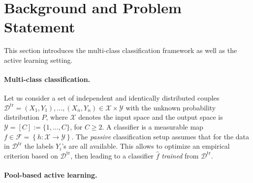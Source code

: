 \documentclass[twoside]{article}
\theoremstyle{definition}
\theoremstyle{remark}
\newcommand{\Dtrain}{\mathcal{D}^{\mathrm{tr}}}
\newcommand{\acc}[1]{\left\{ #1 \right\}}
\begin{document}






\section{Background and Problem Statement}
\label{sec:back_pb_statement}

This section introduces the multi-class classification framework as well as the active learning setting. 
%
\paragraph*{Multi-class classification.}
%
Let us consider a set of independent and identically distributed couples $\Dtrain=(X_1,Y_1),\ldots,(X_n,Y_n) \in\mathcal{X} \times \mathcal{Y}$ with the unknown probability distribution $P$, where $\mathcal{X}$ denotes the input space and the output space is $\mathcal{Y} = [C]:= \{1,\ldots,C\}$, for $C \geq 2$.  
%
A classifier is a measurable map $f \in \mathcal{F} = \acc{ h: \mathcal{X} \to \mathcal{Y} }$. 
%
The \emph{passive} classification setup assumes that for the data in 
$\Dtrain$ the labels $Y_i$'s are all available. This allows to optimize an empirical criterion based on $\Dtrain$, then leading to a classifier $\hat{f}$ \emph{trained} from $\Dtrain$. 
%


\paragraph*{Pool-based active learning.}
\end{document}
